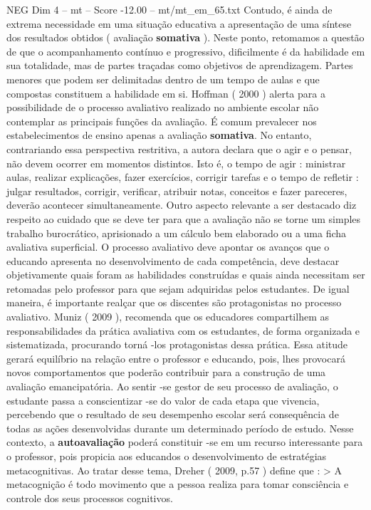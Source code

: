 \begin{textsample}{NEG Dim 4 – mt – Score -12.00 – mt/mt\_em\_65.txt}
Contudo, é ainda de extrema necessidade em uma situação educativa a apresentação de uma síntese dos resultados obtidos ( avaliação \textbf{somativa} ).
Neste ponto, retomamos a questão de que o acompanhamento contínuo e progressivo, dificilmente é da habilidade em sua totalidade, mas de partes traçadas como objetivos de aprendizagem.
Partes menores que podem ser delimitadas dentro de um tempo de aulas e que compostas constituem a habilidade em si.
Hoffman ( 2000 ) alerta para a possibilidade de o processo avaliativo realizado no ambiente escolar não contemplar as principais funções da avaliação.
É comum prevalecer nos estabelecimentos de ensino apenas a avaliação \textbf{somativa}.
No entanto, contrariando essa perspectiva restritiva, a autora declara que o agir e o pensar, não devem ocorrer em momentos distintos.
Isto é, o tempo de agir : ministrar aulas, realizar explicações, fazer exercícios, corrigir tarefas e o tempo de refletir : julgar resultados, corrigir, verificar, atribuir notas, conceitos e fazer pareceres, deverão acontecer simultaneamente.
Outro aspecto relevante a ser destacado diz respeito ao cuidado que se deve ter para que a avaliação não se torne um simples trabalho burocrático, aprisionado a um cálculo bem elaborado ou a uma ficha avaliativa superficial.
O processo avaliativo deve apontar os avanços que o educando apresenta no desenvolvimento de cada competência, deve destacar objetivamente quais foram as habilidades construídas e quais ainda necessitam ser retomadas pelo professor para que sejam adquiridas pelos estudantes.
De igual maneira, é importante realçar que os discentes são protagonistas no processo avaliativo.
Muniz ( 2009 ), recomenda que os educadores compartilhem as responsabilidades da prática avaliativa com os estudantes, de forma organizada e sistematizada, procurando torná -los protagonistas dessa prática.
Essa atitude gerará equilíbrio na relação entre o professor e educando, pois, lhes provocará novos comportamentos que poderão contribuir para a construção de uma avaliação emancipatória.
Ao sentir -se gestor de seu processo de avaliação, o estudante passa a conscientizar -se do valor de cada etapa que vivencia, percebendo que o resultado de seu desempenho escolar será consequência de todas as ações desenvolvidas durante um determinado período de estudo.
Nesse contexto, a \textbf{autoavaliação} poderá constituir -se em um recurso interessante para o professor, pois propicia aos educandos o desenvolvimento de estratégias metacognitivas.
Ao tratar desse tema, Dreher ( 2009, p.57 ) define que : > A metacognição é todo movimento que a pessoa realiza para tomar consciência e controle dos seus processos cognitivos.

\end{textsample}
